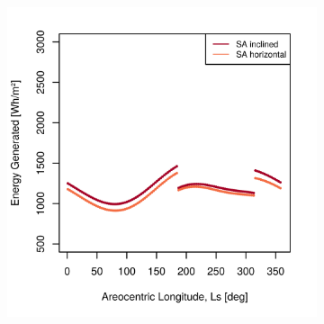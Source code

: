 \begin{figure}[h]
\captionsetup[subfigure]{justification=centering}
\vspace{-2ex}
	\centering
    \setlength{\subfigureWidth}{0.50\textwidth}
    \setlength{\graphicsHeight}{80mm}
    \hypersetup{hidelinks=true}%
    \begin{subfigure}[t]{\subfigureWidth}
        \centering
        \includegraphics[height=\graphicsHeight]{sections/power-system-design/solar-array/plots/ianichaos-daily-generated-energy-for-solar-cell-coverage-area-23m2.png}
        \label{fig:plot:sub:iani-chaos-generated-energy}
    \end{subfigure}\hfill
    \begin{subfigure}[t]{\subfigureWidth}
        \centering

\end{subfigure}
\end{figure}
